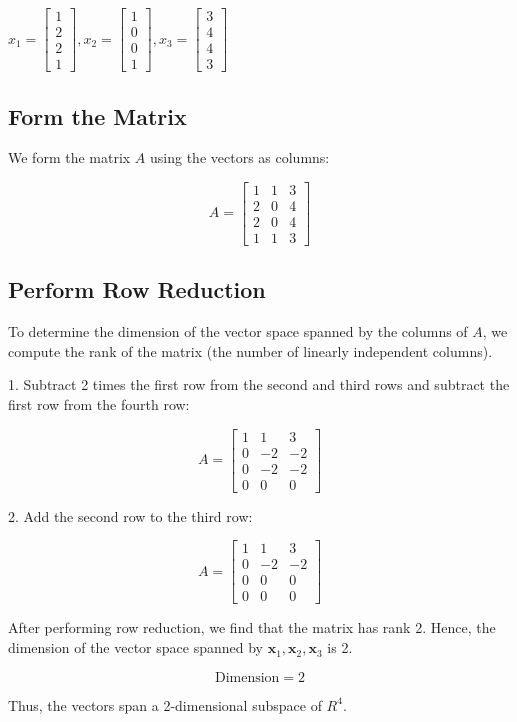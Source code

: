 \documentclass{article}
\begin{document}
$x_1=\begin{bmatrix} 1 \\ 2 \\ 2 \\ 1 \end{bmatrix}, x_2=\begin{bmatrix} 1 \\ 0 \\ 0 \\ 1\end{bmatrix}, x_3= \begin{bmatrix} 3 \\ 4 \\ 4 \\ 3\end{bmatrix}$

\subsection{Form the Matrix}

We form the matrix \( A \) using the vectors as columns:

\[
A = \begin{bmatrix} 1 & 1 & 3 \\
                    2 & 0 & 4 \\
                    2 & 0 & 4 \\
                    1 & 1 & 3 \end{bmatrix}
\]

\subsection{Perform Row Reduction}

To determine the dimension of the vector space spanned by the columns of \( A \), we compute the rank of the matrix (the number of linearly independent columns).

1. Subtract 2 times the first row from the second and third rows and subtract the first row from the fourth row:

\[
A = \begin{bmatrix} 1 & 1 & 3 \\
                    0 & -2 & -2 \\
                    0 & -2 & -2 \\
                    0 & 0 & 0 \end{bmatrix}
\]

2. Add the second row to the third row:

\[
A = \begin{bmatrix} 1 & 1 & 3 \\
                    0 & -2 & -2 \\
                    0 & 0 & 0 \\
                    0 & 0 & 0 \end{bmatrix}
\]

After performing row reduction, we find that the matrix has rank 2. Hence, the dimension of the vector space spanned by \( \mathbf{x}_1, \mathbf{x}_2, \mathbf{x}_3 \) is 2.

\[
\text{Dimension} = 2
\]

Thus, the vectors span a 2-dimensional subspace of \( {R}^4 \).
\end{document}
